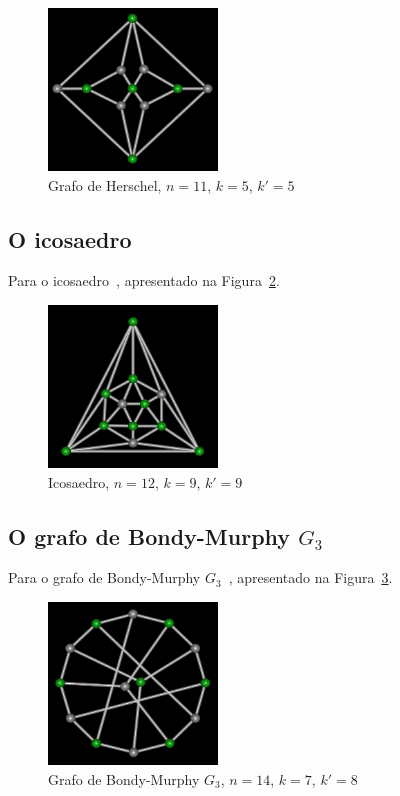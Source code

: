 \begin{figure}[htb]
\centering
\includegraphics[width=0.4\textwidth]{img/herschel.png}
\caption{Grafo de Herschel, $n=11$, $k=5$, $k'=5$}
\label{fig:example-herschel}
\end{figure}


\subsection{O icosaedro}
Para o icosaedro~\cite{cite:example-plato},
apresentado na Figura~\ref{fig:example-icosaedro}.

\begin{figure}[htb]
\centering
\includegraphics[width=0.4\textwidth]{img/icosaedro.png}
\caption{Icosaedro, $n=12$, $k=9$, $k'=9$}
\label{fig:example-icosaedro}
\end{figure}


\subsection{O grafo de Bondy-Murphy $G_3$}
Para o grafo de Bondy-Murphy $G_3$~\cite{cite:example-bondy},
apresentado na Figura~\ref{fig:example-bondymurphyg3}.

\begin{figure}[htb]
\centering
\includegraphics[width=0.4\textwidth]{img/bondymurphyg3.png}
\caption{Grafo de Bondy-Murphy $G_3$, $n=14$, $k=7$, $k'=8$}
\label{fig:example-bondymurphyg3}
\end{figure}


